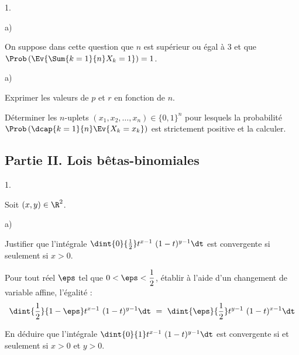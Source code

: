 \documentclass[11pt]{article}%
\begin{document}
\begin{noliste}{1.}
\begin{noliste}{a)}
    
  \end{noliste}

\item On suppose dans cette question que $n$ est supérieur ou égal à
  $3$ et que $\Prob\left(\Ev{\Sum{k=1}{n} X_k = 1}\right)=1$.
  \begin{noliste}{a)}
    \setlength{\itemsep}{2mm}
  \item Exprimer les valeurs de $p$ et $r$ en fonction de $n$.

    

  \item Déterminer les $n$-uplets $(x_1, x_2, \ldots, x_n) \in
    \{0,1\}^n$ pour lesquels la probabilité $\Prob\left( \dcap{k=1}{n}
      \Ev{X_k = x_k}\right)$ est strictement positive et la calculer.

    
  \end{noliste}
\end{noliste}





\subsection*{Partie II. Lois bêtas-binomiales}

\begin{noliste}{1.}
  \setlength{\itemsep}{4mm} %
  \setcounter{enumi}{3}
\item Soit $(x,y) \in \R^2$.
  \begin{noliste}{a)}
    \setlength{\itemsep}{2mm}
  \item Justifier que l'intégrale $\dint{0}{\frac{1}{2}} t^{x-1} \
    (1-t)^{y-1} \dt$ est convergente si seulement si $x>0$.

    
    
  \item Pour tout réel $\eps$ tel que $0 < \eps < \dfrac{1}{2}$,
    établir à l'aide d'un changement de variable affine, l'égalité :
    \[
    \dint{\frac{1}{2}}{1-\eps} t^{x-1} \ (1-t)^{y-1} \dt \ = \
    \dint{\eps}{\frac{1}{2}} t^{y-1} \ (1-t)^{x-1} \dt
    \]

    
    



  \item En déduire que l'intégrale $\dint{0}{1} t^{x-1} \ (1-t)^{y-1}
    \dt$ est convergente si et seulement si $x>0$ et $y>0$.

    
  \end{noliste}
\end{noliste}
\end{document}
